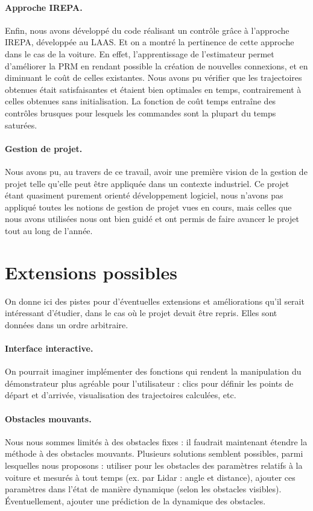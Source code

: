 \documentclass[a4paper,12pt]{report}
\begin{document}
\paragraph{Approche IREPA.} Enfin, nous avons développé du code réalisant un contrôle grâce à l'approche IREPA, développée au LAAS. Et on a montré la pertinence de cette approche dans le cas de la voiture. En effet, l'apprentissage de l'estimateur permet d'améliorer la PRM en rendant possible la création de nouvelles connexions, et en diminuant le coût de celles existantes. Nous avons pu vérifier que les trajectoires obtenues était satisfaisantes et étaient bien optimales en temps, contrairement à celles obtenues sans initialisation. La fonction de coût temps entraîne des contrôles brusques pour lesquels les commandes sont la plupart du temps saturées.

\paragraph{Gestion de projet.} Nous avons pu, au travers de ce travail, avoir une première vision de la gestion de projet telle qu'elle peut être appliquée dans un contexte industriel. Ce projet étant quasiment purement orienté développement logiciel, nous n'avons pas appliqué toutes les notions de gestion de projet vues en cours, mais celles que nous avons utilisées nous ont bien guidé et ont permis de faire avancer le projet tout au long de l'année. 





\section{Extensions possibles}
On donne ici des pistes pour d'éventuelles extensions et améliorations qu'il serait intéressant d'étudier, dans le cas où le projet devait être repris. Elles sont données dans un ordre arbitraire.

\paragraph{Interface interactive.} 
On pourrait imaginer implémenter des fonctions qui rendent la manipulation du démonstrateur plus agréable pour l'utilisateur : clics pour définir les points de départ et d'arrivée, visualisation des trajectoires calculées, etc.

\paragraph{Obstacles mouvants.} Nous nous sommes limités à des obstacles fixes : il faudrait maintenant étendre la méthode à des obstacles mouvants. Plusieurs solutions semblent possibles, parmi lesquelles nous proposons : utiliser pour les obstacles des paramètres relatifs à la voiture et mesurés à tout temps (ex. par Lidar : angle et distance), ajouter ces paramètres dans l'état de manière dynamique (selon les obstacles visibles). Éventuellement, ajouter une prédiction de la dynamique des obstacles.
\end{document}
